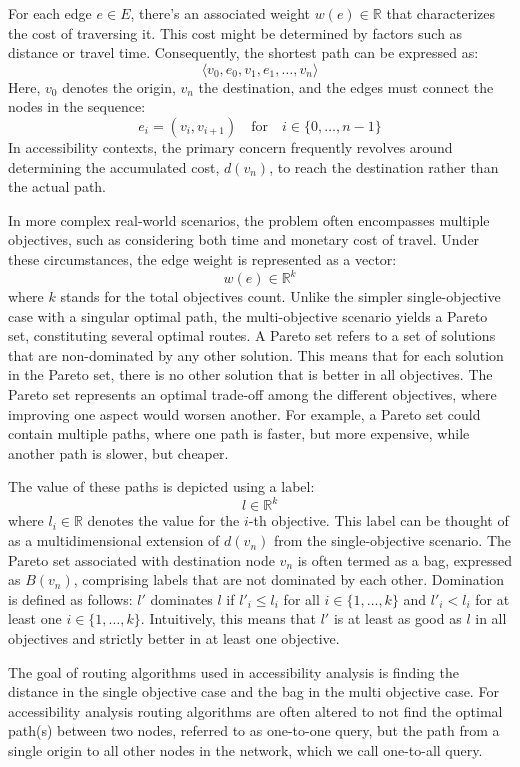 For each edge \( e \in E \), there's an associated weight \( w(e) \in \mathbb{R} \) that characterizes the cost of traversing it.
This cost might be determined by factors such as distance or travel time.
Consequently, the shortest path can be expressed as:
\[ \langle v_0, e_0, v_1, e_1, \dots, v_n \rangle \]
Here, \( v_0 \) denotes the origin, \( v_n \) the destination, and the edges must connect the nodes in the sequence:
\[ e_i = (v_i, v_{i+1}) \quad \text{for} \quad i \in \{0, \dots, n-1\} \]
In accessibility contexts, the primary concern frequently revolves around determining the accumulated cost, \( d(v_n) \), to reach the destination rather than the actual path.

In more complex real-world scenarios, the problem often encompasses multiple objectives, such as considering both time and monetary cost of travel.
Under these circumstances, the edge weight is represented as a vector:
\[ w(e) \in \mathbb{R}^k \]
where \( k \) stands for the total objectives count.
Unlike the simpler single-objective case with a singular optimal path, the multi-objective scenario yields a Pareto set, constituting several optimal routes.
A Pareto set refers to a set of solutions that are non-dominated by any other solution.
This means that for each solution in the Pareto set, there is no other solution that is better in all objectives.
The Pareto set represents an optimal trade-off among the different objectives, where improving one aspect would worsen another.
For example, a Pareto set could contain multiple paths, where one path is faster, but more expensive, while another path is slower, but cheaper.

The value of these paths is depicted using a label:
\[ l \in \mathbb{R}^k \]
where \( l_i \in \mathbb{R} \) denotes the value for the \( i \)-th objective.
This label can be thought of as a multidimensional extension of \( d(v_n) \) from the single-objective scenario.
The Pareto set associated with destination node \( v_n \) is often termed as a bag, expressed as \( B(v_n) \), comprising labels that are not dominated by each other.
Domination is defined as follows: \( l' \) dominates \( l \) if \( l'_i \leq l_i \) for all \( i \in \{1, \dots, k\} \) and \( l'_i < l_i \) for at least one \( i \in \{1, \dots, k\} \).
Intuitively, this means that \( l' \) is at least as good as \( l \) in all objectives and strictly better in at least one objective.

The goal of routing algorithms used in accessibility analysis is finding the distance in the single objective case and the bag in the multi objective case.
For accessibility analysis routing algorithms are often altered to not find the optimal path(s) between two nodes, referred to as one-to-one query, but the path from a single origin to all other nodes in the network, which we call one-to-all query.

